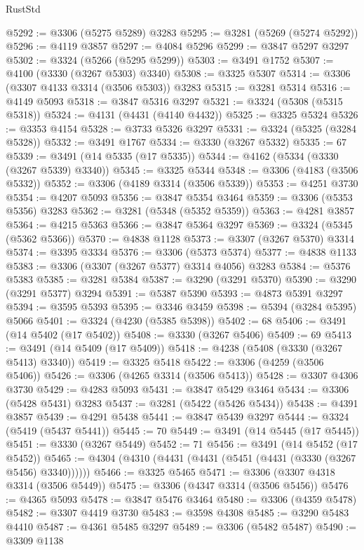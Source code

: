 \begin{lexlean}{RustStd}
\begin{coremodule}
@5292 := @3306 (@5275 @5289) @3283
@5295 := @3281 (@5269 (@5274 @5292))
@5296 := @4119 @3857
@5297 := @4084 @5296
@5299 := @3847 @5297 @3297
@5302 := @3324 (@5266 (@5295 @5299))
@5303 := @3491 @1752
@5307 := @4100 (@3330 (@3267 @5303) @3340)
@5308 := @3325 @5307
@5314 := @3306 (@3307 @4133 @3314 (@3506 @5303)) @3283
@5315 := @3281 @5314
@5316 := @4149 @5093
@5318 := @3847 @5316 @3297
@5321 := @3324 (@5308 (@5315 @5318))
@5324 := @4131 (@4431 (@4140 @4432))
@5325 := @3325 @5324
@5326 := @3353 @4154
@5328 := @3733 @5326 @3297
@5331 := @3324 (@5325 (@3284 @5328))
@5332 := @3491 @1767
@5334 := @3330 (@3267 @5332)
@5335 := 67
@5339 := @3491 (@14 @5335 (@17 @5335))
@5344 := @4162 (@5334 (@3330 (@3267 @5339) @3340))
@5345 := @3325 @5344
@5348 := @3306 (@4183 (@3506 @5332))
@5352 := @3306 (@4189 @3314 (@3506 @5339))
@5353 := @4251 @3730
@5354 := @4207 @5093
@5356 := @3847 @5354 @3464
@5359 := @3306 (@5353 @5356) @3283
@5362 := @3281 (@5348 (@5352 @5359))
@5363 := @4281 @3857
@5364 := @4215 @5363
@5366 := @3847 @5364 @3297
@5369 := @3324 (@5345 (@5362 @5366))
@5370 := @4838 @1128
@5373 := @3307 (@3267 @5370) @3314
@5374 := @3395 @3334
@5376 := @3306 (@5373 @5374)
@5377 := @4838 @1133
@5383 := @3306 (@3307 (@3267 @5377) @3314 @4056) @3283
@5384 := @5376 @5383
@5385 := @3281 @5384
@5387 := @3290 (@3291 @5370)
@5390 := @3290 (@3291 @5377) @3294
@5391 := @5387 @5390
@5393 := @4873 @5391 @3297
@5394 := @3595 @5393
@5395 := @3346 @3459
@5398 := @5394 (@3284 @5395) @5066
@5401 := @3324 (@4230 (@5385 @5398))
@5402 := 68
@5406 := @3491 (@14 @5402 (@17 @5402))
@5408 := @3330 (@3267 @5406)
@5409 := 69
@5413 := @3491 (@14 @5409 (@17 @5409))
@5418 := @4238 (@5408 (@3330 (@3267 @5413) @3340))
@5419 := @3325 @5418
@5422 := @3306 (@4259 (@3506 @5406))
@5426 := @3306 (@4265 @3314 (@3506 @5413))
@5428 := @3307 @4306 @3730
@5429 := @4283 @5093
@5431 := @3847 @5429 @3464
@5434 := @3306 (@5428 @5431) @3283
@5437 := @3281 (@5422 (@5426 @5434))
@5438 := @4391 @3857
@5439 := @4291 @5438
@5441 := @3847 @5439 @3297
@5444 := @3324 (@5419 (@5437 @5441))
@5445 := 70
@5449 := @3491 (@14 @5445 (@17 @5445))
@5451 := @3330 (@3267 @5449)
@5452 := 71
@5456 := @3491 (@14 @5452 (@17 @5452))
@5465 := @4304 (@4310 (@4431 (@4431 (@5451 (@4431 (@3330 (@3267 @5456) @3340))))))
@5466 := @3325 @5465
@5471 := @3306 (@3307 @4318 @3314 (@3506 @5449))
@5475 := @3306 (@4347 @3314 (@3506 @5456))
@5476 := @4365 @5093
@5478 := @3847 @5476 @3464
@5480 := @3306 (@4359 @5478)
@5482 := @3307 @4419 @3730
@5483 := @3598 @4308
@5485 := @3290 @5483 @4410
@5487 := @4361 @5485 @3297
@5489 := @3306 (@5482 @5487)
@5490 := @3309 @1138

\end{coremodule}
\end{lexlean}
